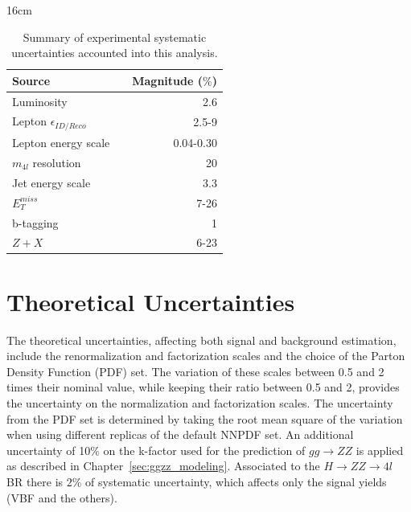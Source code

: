 \begin{table}[hbtp]{16cm}
	\label{tab:experimental_systematic_uncertainties}
	\caption{Summary of experimental systematic uncertainties accounted into this analysis.}
	\centering
	\begin{tabular}{lcr}
		\hline
		\rowcolor{light_gray}
		Source                        && Magnitude ($\%$)\\
		\hline
		Luminosity                    && 2.6\\
		Lepton $\epsilon_{ID/Reco}$   && 2.5-9\\
		Lepton energy scale           && 0.04-0.30\\
		$m_{4l}$ resolution           && 20\\
		Jet energy scale              && 3.3\\
		$E_{T}^{miss}$                && 7-26\\
		b-tagging                     && 1\\
		$Z+X$                         && 6-23\\
		\hline
	\end{tabular}
\end{table}

\section{Theoretical Uncertainties}
\label{theoretical_uncertainties}
The theoretical uncertainties, affecting both signal and background estimation, include the renormalization and factorization scales and the choice of the Parton Density Function (PDF) set. The variation of these scales between 0.5 and 2 times their nominal value, while keeping their ratio between 0.5 and 2, provides the uncertainty on the normalization and factorization scales. The uncertainty from the PDF set is determined by taking the root mean square of the variation when using different replicas of the default NNPDF set. An additional uncertainty of 10$\%$ on the k-factor used for the prediction of $gg \rightarrow ZZ$ is applied as described in Chapter~\ref{sec:ggzz_modeling}. Associated to the $H \rightarrow ZZ \rightarrow 4l$ BR there is $2\%$ of systematic uncertainty, which affects only the signal yields (VBF and the others).

